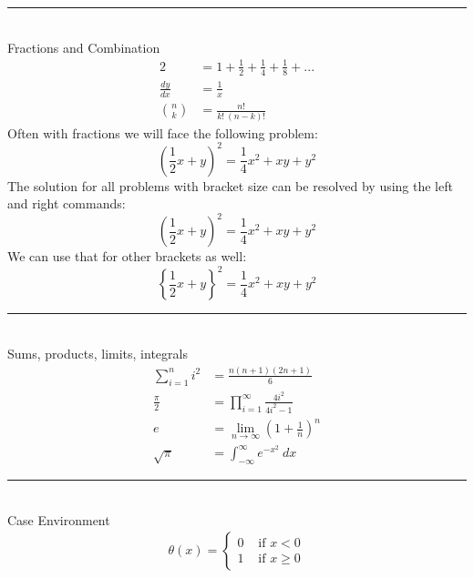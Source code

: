 \documentclass[11pt,a4paper]{article}
\newcounter{problem}
\begin{document}
\noindent\rule{\textwidth}{0.6pt} \\
{\large Fractions and Combination}
\begin{align*}
    2 &= 1 + \frac{1}{2} + \frac{1}{4} + \frac{1}{8} + ... \\
    \frac{dy}{dx} &= \frac{1}{x} \\[7pt]
    \binom{n}{k} &= \frac{n!}{k!\ (n-k)!}
\end{align*}
Often with fractions we will face the following problem:
\[
    (\frac{1}{2}x + y)^2 = \frac{1}{4}x^2 + xy + y^2
\]
The solution for all problems with bracket size can be resolved by using the left and right commands:
\[
    \left(\frac{1}{2}x + y \right)^2 = \frac{1}{4}x^2 + xy + y^2
\]
We can use that for other brackets as well:
\[
    \left\{\frac{1}{2}x + y \right\}^2 = \frac{1}{4}x^2 + xy + y^2
\]

\noindent\rule{\textwidth}{0.6pt} \\
{\large Sums, products, limits, integrals}
\begin{align*}
    \sum_{i = 1}^n i^2 &= \frac{n(n+1)(2n+1)}{6} \\[12pt]
    \frac{\pi}{2} &= \prod_{i = 1}^\infty \frac{4i^2}{4i^2 - 1} \\[12pt]
    e &= \lim_{n \to \infty} \left( 1 + \frac{1}{n} \right)^n \\[12pt]
    \sqrt{\pi} &= \int_{-\infty}^\infty e^{-x^2}\ dx
\end{align*}

\noindent\rule{\textwidth}{0.6pt} \\
{\large Case Environment}
\begin{align*}
    \theta(x) = \begin{cases}
        0 & \text{  if  $x < 0$} \\
        1 & \text{  if  $x \geq 0$}
    \end{cases}
\end{align*}
\end{document}
